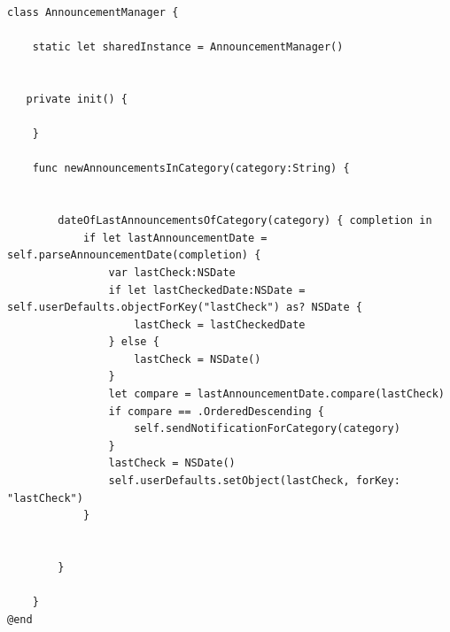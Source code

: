 \documentclass{iiuwb}
\begin{document}
\begin{lstlisting}[label=AnnouncementManager, caption=Klasa AnnouncementManager]
class AnnouncementManager {
    
    static let sharedInstance = AnnouncementManager()
    
    
   private init() {

    }
    
    func newAnnouncementsInCategory(category:String) {
        
        
        dateOfLastAnnouncementsOfCategory(category) { completion in
            if let lastAnnouncementDate = self.parseAnnouncementDate(completion) {
                var lastCheck:NSDate
                if let lastCheckedDate:NSDate = self.userDefaults.objectForKey("lastCheck") as? NSDate {
                    lastCheck = lastCheckedDate
                } else {
                    lastCheck = NSDate()
                }
                let compare = lastAnnouncementDate.compare(lastCheck)
                if compare == .OrderedDescending {
                    self.sendNotificationForCategory(category)
                }
                lastCheck = NSDate()
                self.userDefaults.setObject(lastCheck, forKey: "lastCheck")
            }
            
            
        }
        
    }
@end
\end{lstlisting}
\newpage
\end{document}
